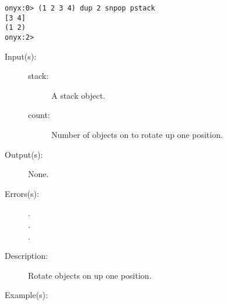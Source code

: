 \begin{description}
\begin{description}
\begin{verbatim}
onyx:0> (1 2 3 4) dup 2 snpop pstack
[3 4]
(1 2)
onyx:2>
		\end{verbatim}
	\end{description}
\label{systemdict:snup}
\item[{\onyxop{stack count}{snup}{--}}: ]
	\begin{description}\item[]
	\item[Input(s): ]
		\begin{description}\item[]
		\item[stack: ]
			A stack object.
		\item[count: ]
			Number of objects on  to rotate up one
			position.
		\end{description}
	\item[Output(s): ] None.
	\item[Errors(s): ]
		\begin{description}\item[]
		\item[.]
		\item[.]
		\item[.]
		\end{description}
	\item[Description: ]
		Rotate  objects on  up one position.
	\item[Example(s): ]\begin{verbatim}


\end{verbatim}
\end{description}
\end{description}
